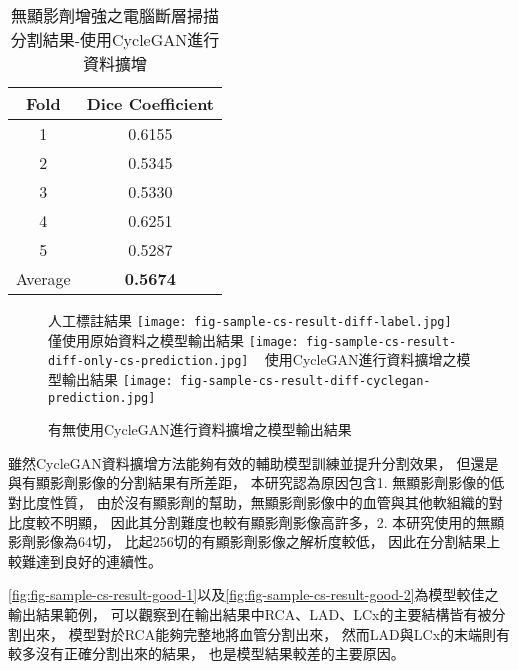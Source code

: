 \documentclass[class=NCU_thesis, crop=false]{standalone}
\begin{document}
\begin{table}[h]
    \centering
    \caption{無顯影劑增強之電腦斷層掃描分割結果-使用CycleGAN進行資料擴增}
    \label{table:table-cs-cyclegan-result}
    \begin{tabular}{cc}
    \hline
    Fold & Dice Coeﬀicient \\
    \hline
    1 & 0.6155 \\
    2 & 0.5345 \\
    3 & 0.5330 \\
    4 & 0.6251 \\
    5 & 0.5287 \\
    \hline
    Average & \textbf{0.5674} \\
    \hline
    \end{tabular}
\end{table}



\begin{figure}[!hbt]
    \centering
    \subcaptionbox
        {人工標註結果
        \label{fig:fig-sample-cs-result-diff-label}}
        {\texttt{[image: fig-sample-cs-result-diff-label.jpg]}}
    ~
    \subcaptionbox
        {僅使用原始資料之模型輸出結果
        \label{fig:fig-sample-cs-result-diff-only-cs-prediction}}
        {\texttt{[image: fig-sample-cs-result-diff-only-cs-prediction.jpg]}}
    ~
    \subcaptionbox
        {使用CycleGAN進行資料擴增之模型輸出結果
        \label{fig:fig-sample-cs-result-diff-cyclegan-prediction}}
        {\texttt{[image: fig-sample-cs-result-diff-cyclegan-prediction.jpg]}}
    \caption{有無使用CycleGAN進行資料擴增之模型輸出結果}
    \label{fig:fig-sample-cs-result-diff-cyclegan}
\end{figure}

雖然CycleGAN資料擴增方法能夠有效的輔助模型訓練並提升分割效果，
但還是與有顯影劑影像的分割結果有所差距，
本研究認為原因包含1. 無顯影劑影像的低對比度性質，
由於沒有顯影劑的幫助，無顯影劑影像中的血管與其他軟組織的對比度較不明顯，
因此其分割難度也較有顯影劑影像高許多，2. 本研究使用的無顯影劑影像為64切，
比起256切的有顯影劑影像之解析度較低，
因此在分割結果上較難達到良好的連續性。

\cref{fig:fig-sample-cs-result-good-1}以及\cref{fig:fig-sample-cs-result-good-2}為模型較佳之輸出結果範例，
可以觀察到在輸出結果中RCA、LAD、LCx的主要結構皆有被分割出來，
模型對於RCA能夠完整地將血管分割出來，
然而LAD與LCx的末端則有較多沒有正確分割出來的結果，
也是模型結果較差的主要原因。
\end{document}
